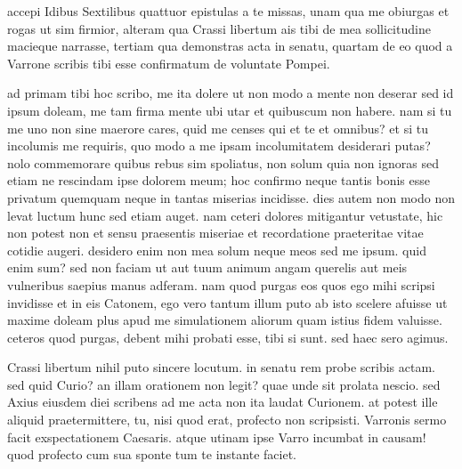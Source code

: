 


 accepi Idibus Sextilibus quattuor epistulas a te missas, unam qua me obiurgas et rogas ut sim firmior, alteram qua Crassi libertum ais tibi de mea sollicitudine macieque narrasse, tertiam qua demonstras acta in senatu, quartam de eo quod a Varrone scribis tibi esse confirmatum de voluntate Pompei.

 ad primam tibi hoc scribo, me ita dolere ut non modo a mente non deserar sed id ipsum doleam, me tam firma mente ubi utar et quibuscum non habere. nam si tu me uno non sine maerore cares, quid me censes qui et te et omnibus? et si tu incolumis me requiris, quo modo a me ipsam incolumitatem desiderari putas? nolo commemorare quibus rebus sim spoliatus, non solum quia non ignoras sed etiam ne rescindam ipse dolorem meum; hoc confirmo neque tantis bonis esse privatum quemquam neque in tantas miserias incidisse. dies autem non modo non levat luctum hunc sed etiam auget. nam ceteri dolores mitigantur vetustate, hic non potest non et sensu praesentis miseriae et recordatione praeteritae vitae cotidie augeri. desidero enim non mea solum neque meos sed me ipsum. quid enim sum? sed non faciam ut aut tuum animum angam querelis aut meis vulneribus saepius manus adferam. nam quod purgas eos quos ego mihi scripsi invidisse et in eis Catonem, ego vero tantum illum puto ab isto scelere afuisse ut maxime doleam plus apud me simulationem aliorum quam istius fidem valuisse. ceteros quod purgas, debent mihi probati esse, tibi si sunt. sed haec sero agimus.

 Crassi libertum nihil puto sincere locutum. in senatu rem probe scribis actam. sed quid Curio? an illam orationem non legit? quae unde sit prolata nescio. sed Axius eiusdem diei scribens ad me acta non ita laudat Curionem. at potest ille aliquid praetermittere, tu, nisi quod erat, profecto non scripsisti. Varronis sermo facit exspectationem Caesaris. atque utinam ipse Varro incumbat in causam! quod profecto cum sua sponte tum te instante faciet.

